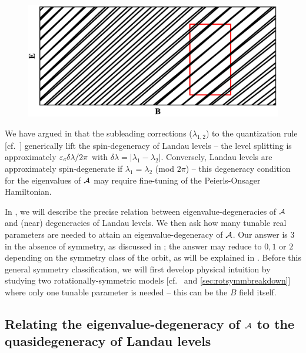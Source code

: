 \documentclass[aps, prb, showpacs, twocolumn, notitlepage, superscriptaddress]{revtex4-1}
\begin{document}
\begin{figure}
\includegraphics[width=1.0\columnwidth]{LL.png}
\caption{\label{fig:LL}}
\end{figure}

We have argued in  that the subleading corrections ($\lambda_{1,2}$) to the quantization rule [cf.\ ] generically lift the spin-degeneracy of Landau levels -- the level splitting is approximately $\varepsilon_c\delta \lambda/2\pi$ with $\delta \lambda=|\lambda_1-\lambda_2|$. Conversely, Landau levels are approximately spin-degenerate if $\lambda_1{=}\lambda_2$ (mod $2\pi$) -- this degeneracy condition for the eigenvalues of ${\cal A}$ may require fine-tuning of the Peierls-Onsager Hamiltonian.  

In , we will describe the precise relation between eigenvalue-degeneracies of  ${\cal A}$ and (near) degeneracies of Landau levels. We then ask how many tunable real parameters are needed to attain an eigenvalue-degeneracy of ${\cal A}$. Our answer is  $3$ in the absence of symmetry, as discussed in ; the answer may reduce to $0,1$ or $2$ depending on the symmetry class of the orbit, as will be explained in . Before this general symmetry classification,  we will first develop physical intuition by studying two rotationally-symmetric models [cf.\  and \ref{sec:rotsymmbreakdown}] where only one tunable parameter is needed -- this can be the $B$ field itself.


\subsection{Relating the eigenvalue-degeneracy of ${\cal A}$ to the quasidegeneracy of Landau levels}\label{sec:relatedegeneracies}
\end{document}
